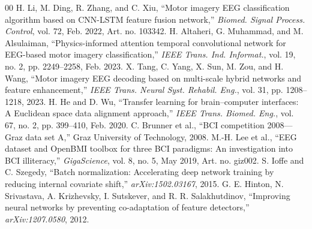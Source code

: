 \documentclass[conference]{IEEEtran}
\begin{document}
\begin{thebibliography}{00}
 H. Li, M. Ding, R. Zhang, and C. Xiu, ``Motor imagery EEG classification algorithm based on CNN-LSTM feature fusion network,'' \textit{Biomed. Signal Process. Control}, vol. 72, Feb. 2022, Art. no. 103342.
 H. Altaheri, G. Muhammad, and M. Alsulaiman, ``Physics-informed attention temporal convolutional network for EEG-based motor imagery classification,'' \textit{IEEE Trans. Ind. Informat.}, vol. 19, no. 2, pp. 2249--2258, Feb. 2023.
 X. Tang, C. Yang, X. Sun, M. Zou, and H. Wang, ``Motor imagery EEG decoding based on multi-scale hybrid networks and feature enhancement,'' \textit{IEEE Trans. Neural Syst. Rehabil. Eng.}, vol. 31, pp. 1208--1218, 2023.
 H. He and D. Wu, ``Transfer learning for brain--computer interfaces: A Euclidean space data alignment approach,'' \textit{IEEE Trans. Biomed. Eng.}, vol. 67, no. 2, pp. 399--410, Feb. 2020.
 C. Brunner et al., ``BCI competition 2008---Graz data set A,'' Graz University of Technology, 2008.
 M.-H. Lee et al., ``EEG dataset and OpenBMI toolbox for three BCI paradigms: An investigation into BCI illiteracy,'' \textit{GigaScience}, vol. 8, no. 5, May 2019, Art. no. giz002.
 S. Ioffe and C. Szegedy, ``Batch normalization: Accelerating deep network training by reducing internal covariate shift,'' \textit{arXiv:1502.03167}, 2015.
 G. E. Hinton, N. Srivastava, A. Krizhevsky, I. Sutskever, and R. R. Salakhutdinov, ``Improving neural networks by preventing co-adaptation of feature detectors,'' \textit{arXiv:1207.0580}, 2012.
\end{thebibliography}
\end{document}
